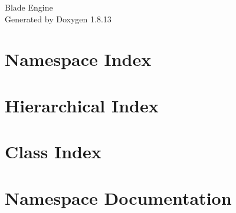 \documentclass[twoside]{book}
\newcommand{\+}{\discretionary{\mbox{\scriptsize$\hookleftarrow$}}{}{}}
\newcommand{\clearemptydoublepage}{%
  \newpage{\pagestyle{empty}\cleardoublepage}%
}
\begin{document}
\hypersetup{pageanchor=false,
             bookmarksnumbered=true,
             pdfencoding=unicode
            }
\begin{titlepage}
\vspace*{7cm}
\begin{center}%
{\Large Blade Engine }\\
\vspace*{1cm}
{\large Generated by Doxygen 1.8.13}\\
\end{center}
\end{titlepage}
\clearemptydoublepage
{}
\tableofcontents
\clearemptydoublepage
{}
\hypersetup{pageanchor=true}

\chapter{Namespace Index}

\chapter{Hierarchical Index}

\chapter{Class Index}

\chapter{Namespace Documentation}

\end{document}
